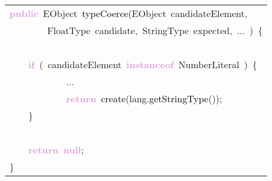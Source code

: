 \begin{tabular}[t]{l}
\noindent
\mbox{}\textbf{\textcolor{Plum}{public}}\ EObject\ \textcolor{Black}{typeCoerce}(EObject\ candidateElement,\  \\
\mbox{}\ \ \ \ \ \ \ \ FloatType\ candidate,\ StringType\ expected,\ ...\ )\ \{ \\
\mbox{}\ \ \ \  \\
\mbox{}\ \ \ \ \textbf{\textcolor{Plum}{if}}\ (\ candidateElement\ \textbf{\textcolor{Plum}{instanceof}}\ NumberLiteral\ )\ \{ \\
\mbox{}\ \ \ \ \ \ \ \ \ \ \ \ ... \\
\mbox{}\ \ \ \ \ \ \ \ \ \ \ \ \textbf{\textcolor{Plum}{return}}\ \textcolor{Black}{create}(lang.\textcolor{Black}{getStringType}()); \\
\mbox{}\ \ \ \ \} \\
\mbox{}\ \ \ \  \\
\mbox{}\ \ \ \ \textbf{\textcolor{Plum}{return}}\ \textbf{\textcolor{Plum}{null}}; \\
\mbox{}\}
\end{tabular}
